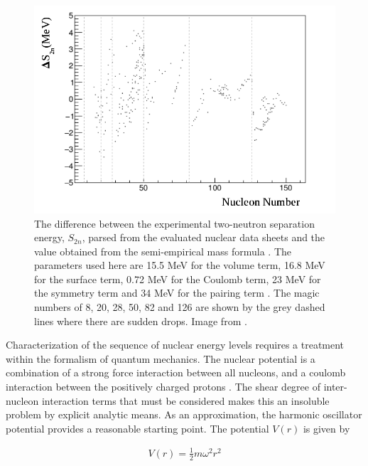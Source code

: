 \begin{figure}[!ht]
  \centering
  \includegraphics[width=\textwidth]{theory_two_neutron.png}
  \caption[The difference between the experimental two-neutron separation energy, $S_{2n}$, parsed from the evaluated nuclear data sheets \cite{EvittsParse} and the value obtained from the semi-empirical mass formula \cite{KraneText}.]{The difference between the experimental two-neutron separation energy, $S_{2n}$, parsed from the evaluated nuclear data sheets \cite{EvittsParse} and the value obtained from the semi-empirical mass formula \cite{KraneText}. The parameters used here are 15.5 MeV for the volume term, 16.8 MeV for the surface term, 0.72 MeV for the Coulomb term, 23 MeV for the symmetry term and 34 MeV for the pairing term \cite{KraneText}. The magic numbers of 8, 20, 28, 50, 82 and 126 are shown by the grey dashed lines where there are sudden drops. Image from \cite{EvittsThesis}.}
  \label{figure: two neutron separation energy plot}
\end{figure}

Characterization of the sequence of nuclear energy levels requires a treatment within the formalism of quantum mechanics. The nuclear potential is a combination of a strong force interaction between all nucleons, and a coulomb interaction between the positively charged protons \cite{CastenText}. The shear degree of inter-nucleon interaction terms that must be considered makes this an insoluble problem by explicit analytic means. As an approximation, the harmonic oscillator potential provides a reasonable starting point. The potential $V(r)$ is given by \cite{CastenText}

\begin{align}
	V(r) = \frac{1}{2}m\omega^2r^2
	\label{equation: harmonic oscillator potential}
\end{align}


